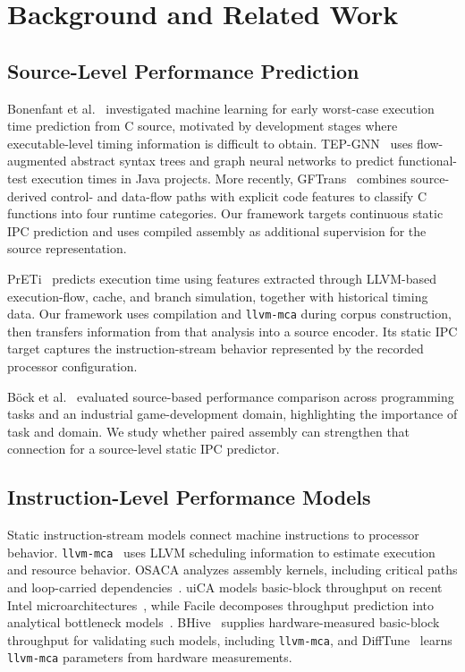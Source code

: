 \documentclass[conference]{IEEEtran}
\newcommand{\llvmmca}{\texttt{llvm-mca}}
\begin{document}
\section{Background and Related Work}
\subsection{Source-Level Performance Prediction}
Bonenfant et al.~\cite{bonenfant2017wcet} investigated machine learning for early worst-case execution time prediction from C source, motivated by development stages where executable-level timing information is difficult to obtain. TEP-GNN~\cite{samoaa2022tep} uses flow-augmented abstract syntax trees and graph neural networks to predict functional-test execution times in Java projects. More recently, GFTrans~\cite{li2026gftrans} combines source-derived control- and data-flow paths with explicit code features to classify C functions into four runtime categories. Our framework targets continuous static IPC prediction and uses compiled assembly as additional supervision for the source representation.

PrETi~\cite{xu2025preti} predicts execution time using features extracted through LLVM-based execution-flow, cache, and branch simulation, together with historical timing data. Our framework uses compilation and \llvmmca{} during corpus construction, then transfers information from that analysis into a source encoder. Its static IPC target captures the instruction-stream behavior represented by the recorded processor configuration. 

B\"ock et al.~\cite{bock2023domain} evaluated source-based performance comparison across programming tasks and an industrial game-development domain, highlighting the importance of task and domain. We study whether paired assembly can strengthen that connection for a source-level static IPC predictor.

\subsection{Instruction-Level Performance Models}
Static instruction-stream models connect machine instructions to processor behavior. \llvmmca{}~\cite{llvm_mca} uses LLVM scheduling information to estimate execution and resource behavior. OSACA analyzes assembly kernels, including critical paths and loop-carried dependencies~\cite{laukemann2019osaca}. uiCA models basic-block throughput on recent Intel microarchitectures~\cite{abel2022uica}, while Facile decomposes throughput prediction into analytical bottleneck models~\cite{abel2023facile}. BHive~\cite{chen2019bhive} supplies hardware-measured basic-block throughput for validating such models, including \llvmmca{}, and DiffTune~\cite{renda2020difftune} learns \llvmmca{} parameters from hardware measurements.
\end{document}
